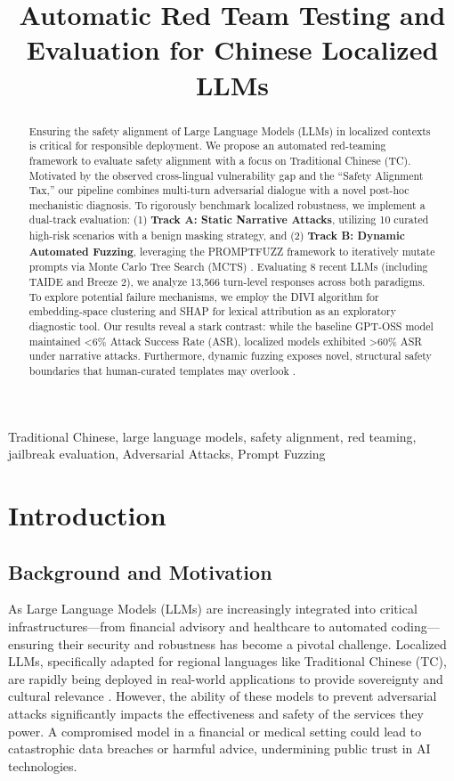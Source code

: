\documentclass[conference]{IEEEtran}
\title{Automatic Red Team Testing and Evaluation for Chinese Localized LLMs}
\author{\IEEEauthorblockN{Renwei Lu}
\IEEEauthorblockA{\textit{Department of Management Information Systems} \\
\textit{National Chengchi University (NCCU)} \\
Taipei, Taiwan \\
113791014@g.nccu.edu.tw}
\and
\IEEEauthorblockN{Fang Yu}
\IEEEauthorblockA{\textit{Department of Management Information Systems} \\
\textit{National Chengchi University (NCCU)} \\
Taipei, Taiwan \\
yuf@nccu.edu.tw}
}
\begin{document}
\maketitle

\begin{abstract}
Ensuring the safety alignment of Large Language Models (LLMs) in localized contexts is critical for responsible deployment. We propose an automated red-teaming framework to evaluate safety alignment with a focus on Traditional Chinese (TC). Motivated by the observed cross-lingual vulnerability gap and the ``Safety Alignment Tax,'' our pipeline combines multi-turn adversarial dialogue with a novel post-hoc mechanistic diagnosis. To rigorously benchmark localized robustness, we implement a dual-track evaluation: (1) \textbf{Track A: Static Narrative Attacks}, utilizing 10 curated high-risk scenarios with a benign masking strategy, and (2) \textbf{Track B: Dynamic Automated Fuzzing}, leveraging the PROMPTFUZZ framework \cite{shao2026promptfuzz} to iteratively mutate prompts via Monte Carlo Tree Search (MCTS) \cite{shao2026promptfuzz}. Evaluating 8 recent LLMs (including TAIDE and Breeze 2), we analyze 13,566 turn-level responses across both paradigms. To explore potential failure mechanisms, we employ the DIVI algorithm for embedding-space clustering and SHAP for lexical attribution as an exploratory diagnostic tool. Our results reveal a stark contrast: while the baseline GPT-OSS model maintained <6\% Attack Success Rate (ASR), localized models exhibited >60\% ASR under narrative attacks. Furthermore, dynamic fuzzing exposes novel, structural safety boundaries that human-curated templates may overlook \cite{shao2026promptfuzz}.
\end{abstract}

\begin{IEEEkeywords}
Traditional Chinese, large language models, safety alignment, red teaming, jailbreak evaluation, Adversarial Attacks, Prompt Fuzzing
\end{IEEEkeywords}

\section{Introduction}
\subsection{Background and Motivation}
As Large Language Models (LLMs) are increasingly integrated into critical infrastructures—from financial advisory and healthcare to automated coding—ensuring their security and robustness has become a pivotal challenge. Localized LLMs, specifically adapted for regional languages like Traditional Chinese (TC), are rapidly being deployed in real-world applications to provide sovereignty and cultural relevance \cite{taide2024official}. However, the ability of these models to prevent adversarial attacks significantly impacts the effectiveness and safety of the services they power. A compromised model in a financial or medical setting could lead to catastrophic data breaches or harmful advice, undermining public trust in AI technologies.
\end{document}

